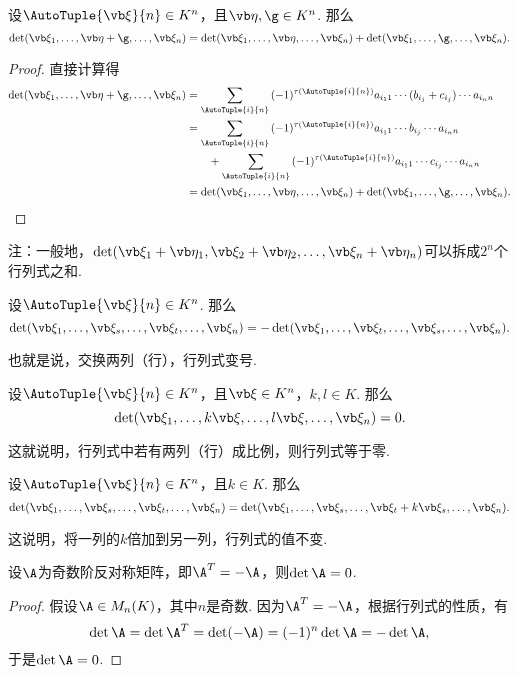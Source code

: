 \begin{property}\label{theorem:行列式.性质3}
设\(\AutoTuple{\a}{n} \in K^n\)，且\(\b,\g \in K^n\).
那么\[
	\det(\a_1,\dotsc,\b + \g,\dotsc,\a_n)
	= \det(\a_1,\dotsc,\b,\dotsc,\a_n)
	+ \det(\a_1,\dotsc,\g,\dotsc,\a_n).
\]
\begin{proof}
直接计算得
\begin{align*}
	\det(\a_1,\dotsc,\b + \g,\dotsc,\a_n)
	&= \sum_{\AutoTuple{i}{n}}{
		(-1)^{\tau(\AutoTuple{i}{n})}
		a_{i_1 1} \dotsm (b_{i_j} + c_{i_j}) \dotsm a_{i_n n}
	} \\
	&= \sum_{\AutoTuple{i}{n}}{
		(-1)^{\tau(\AutoTuple{i}{n})}
		a_{i_1 1} \dotsm b_{i_j} \dotsm a_{i_n n}
	} \\
	&\hspace{20pt}+ \sum_{\AutoTuple{i}{n}}{
		(-1)^{\tau(\AutoTuple{i}{n})}
		a_{i_1 1} \dotsm c_{i_j} \dotsm a_{i_n n}
	} \\
	&= \det(\a_1,\dotsc,\b,\dotsc,\a_n)
		+ \det(\a_1,\dotsc,\g,\dotsc,\a_n).
	\qedhere
\end{align*}
\end{proof}
\end{property}
注：一般地，\(\det(\a_1+\b_1,\a_2+\b_2,\dotsc,\a_n+\b_n)\)可以拆成\(2^n\)个行列式之和.

\begin{property}\label{theorem:行列式.性质4}
设\(\AutoTuple{\a}{n} \in K^n\).
那么\[
	\det(\a_1,\dotsc,\a_s,\dotsc,\a_t,\dotsc,\a_n)
	= -\det(\a_1,\dotsc,\a_t,\dotsc,\a_s,\dotsc,\a_n).
\]
\end{property}
也就是说，交换两列（行），行列式变号.

\begin{property}\label{theorem:行列式.性质5}
设\(\AutoTuple{\a}{n} \in K^n\)，且\(\a \in K^n\)，\(k,l \in K\).
那么\[
	\det(\a_1,\dotsc,k\a,\dotsc,l\a,\dotsc,\a_n) = 0.
\]
\end{property}
这就说明，行列式中若有两列（行）成比例，则行列式等于零.

\begin{property}\label{theorem:行列式.性质6}
设\(\AutoTuple{\a}{n} \in K^n\)，且\(k \in K\).
那么\[
	\det(\a_1,\dotsc,\a_s,\dotsc,\a_t,\dotsc,\a_n)
	= \det(\a_1,\dotsc,\a_s,\dotsc,\a_t + k\a_s,\dotsc,\a_n).
\]
\end{property}
这说明，将一列的\(k\)倍加到另一列，行列式的值不变.

\begin{example}
设\(\A\)为奇数阶反对称矩阵，即\(\A^T = -\A\)，则\(\det\A=0\).
\begin{proof}
假设\(\A \in M_n(K)\)，其中\(n\)是奇数.
因为\(\A^T = -\A\)，根据行列式的性质，有\[
	\det\A
	= \det\A^T
	= \det(-\A)
	= (-1)^n \det\A
	= -\det\A,
\]
于是\(\det\A = 0\).
\end{proof}
\end{example}

